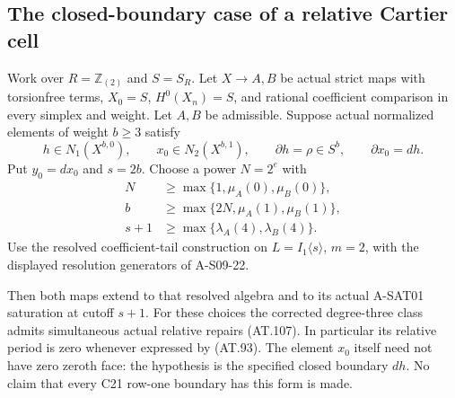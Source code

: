 \subsection{The closed-boundary case of a relative Cartier cell}

\begin{proposition}
\label{AT20}
Work over $R=\mathbb Z_{(2)}$ and $S=S_R$.
Let $X\to A,B$ be actual strict maps with torsionfree terms,
$X_0=S$, $H^0(X_n)=S$, and rational coefficient comparison
in every simplex and weight. Let $A,B$ be admissible.
Suppose actual normalized elements of weight $b\geq3$ satisfy
\[
 h\in N_1(X^{b,0}),\qquad
 x_0\in N_2(X^{b,1}),\qquad
 \partial h=\rho\in S^b,\qquad
 \partial x_0=dh .
 \tag{AT.116}
\]
Put $y_0=dx_0$ and $s=2b$.
Choose a power $N=2^e$ with
\[
 \begin{split}
 N&\geq\max\{1,\mu_A(0),\mu_B(0)\},\\
 b&\geq\max\{2N,\mu_A(1),\mu_B(1)\},\\
 s+1&\geq\max\{\lambda_A(4),\lambda_B(4)\}.
 \end{split}                                                     \tag{AT.117}
\]
Use the resolved coefficient-tail construction on
$L=I_1\langle s\rangle$, $m=2$, with the displayed resolution
generators of A-S09-22.

Then both maps extend to that resolved algebra and to its
actual A-SAT01 saturation at cutoff $s+1$.
For these choices the corrected degree-three class admits
simultaneous actual relative repairs (AT.107).
In particular its relative period is zero whenever expressed
by (AT.93).
The element $x_0$ itself need not have zero zeroth face:
the hypothesis is the specified closed boundary $dh$.
No claim that every C21 row-one boundary has this form is made.
\end{proposition}

